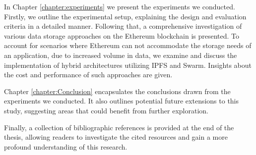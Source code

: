 In Chapter \ref{chapter:experiments} we present the experiments we conducted. Firstly, we outline the experimental setup, explaining the design and evaluation criteria in a detailed manner. Following that, a comprehensive investigation of various data storage approaches on the Ethereum blockchain is presented. To account for scenarios where Ethereum can not accommodate the storage needs of an application, due to increased volume in data, we examine and discuss the implementation of hybrid architectures utilizing IPFS and Swarm. Insights about the cost and performance of such approaches are given.

Chapter \ref{chapter:Conclusion} encapsulates the conclusions drawn from the experiments we conducted. It also outlines potential future extensions to this study, suggesting areas that could benefit from further exploration.

Finally, a collection of bibliographic references is provided at the end of the thesis, allowing readers to investigate the cited resources and gain a more profound understanding of this research.